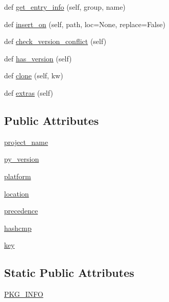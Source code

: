 \begin{DoxyCompactItemize}
def \hyperlink{classpkg__resources_1_1Distribution_a2eb224328a194967021953cd6a122011}{get\+\_\+entry\+\_\+info} (self, group, name)
\item 
def \hyperlink{classpkg__resources_1_1Distribution_a26864ad682f37623654f162a1d0a4c8b}{insert\+\_\+on} (self, path, loc=None, replace=False)
\item 
def \hyperlink{classpkg__resources_1_1Distribution_aecfb70fc29bf652604ed7e97866cd549}{check\+\_\+version\+\_\+conflict} (self)
\item 
def \hyperlink{classpkg__resources_1_1Distribution_aa8b8ad9f54c86275b77b1966881df122}{has\+\_\+version} (self)
\item 
def \hyperlink{classpkg__resources_1_1Distribution_ad737fac85435aff74ecb2fab234ba930}{clone} (self, kw)
\item 
def \hyperlink{classpkg__resources_1_1Distribution_ae382387ed776b026046d59a56291b805}{extras} (self)
\end{DoxyCompactItemize}
\subsection*{Public Attributes}
\begin{DoxyCompactItemize}
\item 
\hyperlink{classpkg__resources_1_1Distribution_a5a41ba765e57c1fe39b6405c2dff69c7}{project\+\_\+name}
\item 
\hyperlink{classpkg__resources_1_1Distribution_a94c84ff74167eef63fecce9f5e3c2a85}{py\+\_\+version}
\item 
\hyperlink{classpkg__resources_1_1Distribution_a0d3120e21ef127c42294a9ad2149613d}{platform}
\item 
\hyperlink{classpkg__resources_1_1Distribution_a48f64f0791d0dffea14e22b9dbc210b3}{location}
\item 
\hyperlink{classpkg__resources_1_1Distribution_afaa162e116709a2b7f4d5e2cd2f4bdcc}{precedence}
\item 
\hyperlink{classpkg__resources_1_1Distribution_af308221b891f0ecdab82948e96bd77be}{hashcmp}
\item 
\hyperlink{classpkg__resources_1_1Distribution_acd3cd8d8ebc1d5b72cee86c87e45049f}{key}
\end{DoxyCompactItemize}
\subsection*{Static Public Attributes}
\begin{DoxyCompactItemize}
\item 
\hyperlink{classpkg__resources_1_1Distribution_a42ae28528c77893b0984282e948b54f9}{P\+K\+G\+\_\+\+I\+N\+FO}
\end{DoxyCompactItemize}


